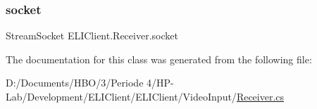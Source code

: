 \subsubsection{\texorpdfstring{socket}{socket}}
{\footnotesize\ttfamily Stream\+Socket E\+L\+I\+Client.\+Receiver.\+socket\hspace{0.3cm}{\ttfamily [private]}}



The documentation for this class was generated from the following file\+:\begin{DoxyCompactItemize}
\item 
D\+:/\+Documents/\+H\+B\+O/3/\+Periode 4/\+H\+P-\/\+Lab/\+Development/\+E\+L\+I\+Client/\+E\+L\+I\+Client/\+Video\+Input/\hyperlink{_receiver_8cs}{Receiver.\+cs}\end{DoxyCompactItemize}
